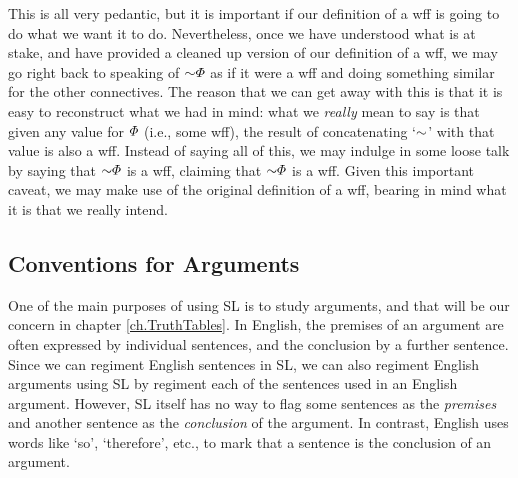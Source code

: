 This is all very pedantic, but it is important if our definition of a wff is going to do what we want it to do.
Nevertheless, once we have understood what is at stake, and have provided a cleaned up version of our definition of a wff, we may go right back to speaking of $\enot \metaA{}$ as if it were a wff and doing something similar for the other connectives. 
The reason that we can get away with this is that it is easy to reconstruct what we had in mind: what we \textit{really} mean to say is that given any value for $\varPhi{}$ (i.e., some wff), the result of concatenating `$\enot$' with that value is also a wff.
Instead of saying all of this, we may indulge in some loose talk by saying that $\enot \metaA{}$ is a wff, claiming that $\enot \metaA{}$ is a wff. 
Given this important caveat, we may make use of the original definition of a wff, bearing in mind what it is that we really intend.





\subsection{Conventions for Arguments}
  \label{sub:QuoteArguments}

One of the main purposes of using SL is to study arguments, and that will be our concern in chapter \ref{ch.TruthTables}.
In English, the premises of an argument are often expressed by individual sentences, and the conclusion by a further sentence.
Since we can regiment English sentences in SL, we can also regiment English arguments using SL by regiment each of the sentences used in an English argument.
However, SL itself has no way to flag some sentences as the \emph{premises} and another sentence as the \emph{conclusion} of the argument.
In contrast, English uses words like `so', `therefore', etc., to mark that a sentence is the conclusion of an argument.


